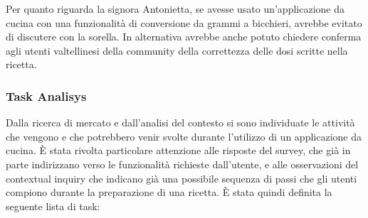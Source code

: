 Per quanto riguarda la signora Antonietta, se avesse usato un'applicazione 
da cucina con una funzionalità di conversione da grammi a
bicchieri, avrebbe evitato di discutere con la sorella. In
alternativa avrebbe anche potuto chiedere conferma agli
utenti valtellinesi della community della correttezza delle dosi scritte
nella ricetta.

\subsubsection{Task Analisys}
Dalla ricerca di mercato e dall'analisi del contesto si sono individuate
le attività che vengono e che potrebbero venir svolte durante l'utilizzo
di un applicazione da cucina. È stata rivolta particolare attenzione
alle risposte del survey, che già in parte indirizzano verso le
funzionalità richieste dall'utente, e alle osservazioni del contextual
inquiry che indicano già una possibile sequenza di passi che gli utenti
compiono durante la preparazione di una ricetta.
È stata quindi definita la seguente lista di task:
